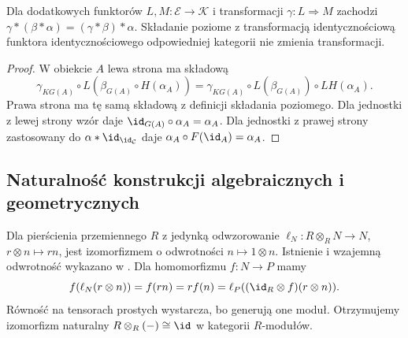 \begin{stwierdzenie}\label{cat:prop:horizontal-assoc}
Dla dodatkowych funktorów $L,M:\mathcal E\to\mathcal K$ i transformacji $\gamma:L\Rightarrow M$ zachodzi
$\gamma\ast(\beta\ast\alpha)=(\gamma\ast\beta)\ast\alpha$.
Składanie poziome z transformacją identycznościową funktora identycznościowego odpowiedniej kategorii nie zmienia transformacji.
\end{stwierdzenie}
\begin{proof}
W obiekcie $A$ lewa strona ma składową
\[
\gamma_{KG(A)}\circ L(\beta_{G(A)}\circ H(\alpha_A))
=\gamma_{KG(A)}\circ L(\beta_{G(A)})\circ LH(\alpha_A).
\]
Prawa strona ma tę samą składową z definicji składania poziomego. Dla jednostki z lewej strony wzór daje $\id_{G(A)}\circ\alpha_A=\alpha_A$. Dla jednostki z prawej strony zastosowany do $\alpha\ast\id_{\id_{\mathcal C}}$ daje $\alpha_A\circ F(\id_A)=\alpha_A$.
\end{proof}

\subsection{Naturalność konstrukcji algebraicznych i geometrycznych}

\begin{przyklad}\label{cat:ex:tensor-unit-natural}
Dla pierścienia przemiennego $R$ z jedynką odwzorowanie $\ell_N:R\otimes_R N\to N$, $r\otimes n\mapsto rn$, jest izomorfizmem o odwrotności $n\mapsto1\otimes n$. Istnienie i wzajemną odwrotność wykazano w . Dla homomorfizmu $f:N\to P$ mamy
\[
f(\ell_N(r\otimes n))=f(rn)=rf(n)=\ell_P((\id_R\otimes f)(r\otimes n)).
\]
Równość na tensorach prostych wystarcza, bo generują one moduł. Otrzymujemy izomorfizm naturalny $R\otimes_R(-)\cong\id$ w kategorii $R$-modułów.
\end{przyklad}

